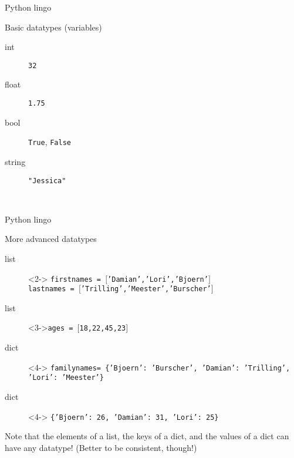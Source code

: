 \documentclass{beamer}
\begin{document}
\begin{frame}{Python lingo}
\begin{block}{Basic datatypes (variables)}
\begin{description}
\item[{\color{red}int}] \texttt{32}
\item[{\color{red}float}] \texttt{1.75}
\item[{\color{red}bool}] \texttt{True}, \texttt{False}
\item[{\color{red}string}] \texttt{"Jessica"}
\end{description}
\end{block}
\\
\end{frame}


\begin{frame}{Python lingo}
\begin{block}{More advanced datatypes}
\begin{description}
\item[{\color{red}list}]<2-> \texttt{firstnames = $[$'Damian','Lori','Bjoern'$]$ \\ lastnames = $[$'Trilling','Meester','Burscher'$]$}
\item[{\color{red}list}]<3->\texttt{ages = $[$18,22,45,23$]$}
\item[{\color{red}dict}]<4-> \texttt{familynames= \{'Bjoern': 'Burscher', 'Damian': 'Trilling', 'Lori': 'Meester'\} }
\item[{\color{red}dict}]<4-> \texttt{\{'Bjoern': 26, 'Damian': 31, 'Lori': 25\} }

\end{description}
\pause
Note that the elements of a list, the keys of a dict, and the values of a dict can have any datatype! (Better to be consistent, though!)
\end{block}
\end{frame}
\end{document}
